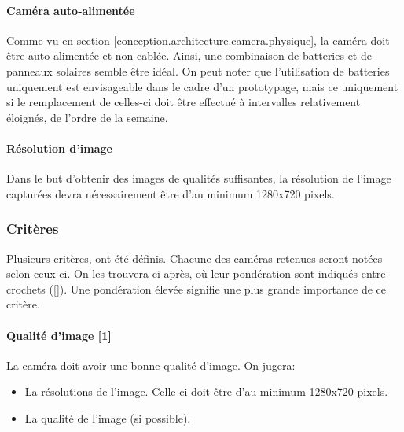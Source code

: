 \paragraph{Caméra auto-alimentée}
Comme vu en section \ref{conception.architecture.camera.physique}, la caméra doit être auto-alimentée et non cablée. Ainsi, une combinaison de batteries et de panneaux solaires semble être idéal. On peut noter que l'utilisation de batteries uniquement est envisageable dans le cadre d'un prototypage, mais ce uniquement si le remplacement de celles-ci doit être effectué à intervalles relativement éloignés, de l'ordre de la semaine.

\paragraph{Résolution d'image}
Dans le but d'obtenir des images de qualités suffisantes, la résolution de l'image capturées devra nécessairement être d'au minimum 1280x720 pixels.

\subsubsection{Critères}
Plusieurs critères, ont été définis. Chacune des caméras retenues seront notées selon ceux-ci. On les trouvera ci-après, où leur pondération sont indiqués entre crochets ([]). Une pondération élevée signifie une plus grande importance de ce critère.

\paragraph{Qualité d'image [1]}
La caméra doit avoir une bonne qualité d'image. On jugera:
\begin{itemize}
    \item La résolutions de l'image. Celle-ci doit être d'au minimum 1280x720 pixels.
    \item La qualité de l'image (si possible).
\end{itemize}


